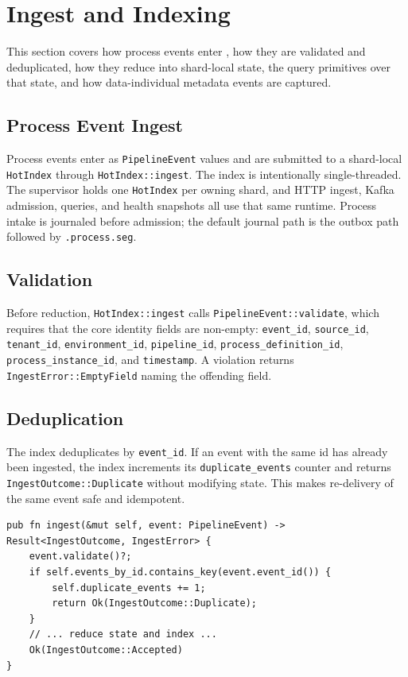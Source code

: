 \section{Ingest and Indexing}
\label{sec:ingest}

This section covers how process events enter \vannak{}, how they are validated
and deduplicated, how they reduce into shard-local state, the query primitives
over that state, and how data-individual metadata events are captured.

\subsection{Process Event Ingest}

Process events enter as \texttt{PipelineEvent} values and are submitted to a
shard-local \texttt{HotIndex} through \texttt{HotIndex::ingest}. The index is
intentionally single-threaded. The supervisor holds one \texttt{HotIndex} per
owning \sitas{} shard, and HTTP ingest, Kafka admission, queries, and health
snapshots all use that same runtime. Process intake is journaled before
admission; the default journal path is the outbox path followed by
\texttt{.process.seg}.

\subsection{Validation}

Before reduction, \texttt{HotIndex::ingest} calls
\texttt{PipelineEvent::validate}, which requires that the core identity fields
are non-empty: \texttt{event\_id}, \texttt{source\_id}, \texttt{tenant\_id},
\texttt{environment\_id}, \texttt{pipeline\_id}, \texttt{process\_definition\_id},
\texttt{process\_instance\_id}, and \texttt{timestamp}. A violation returns
\texttt{IngestError::EmptyField} naming the offending field.

\subsection{Deduplication}

The index deduplicates by \texttt{event\_id}. If an event with the same id has
already been ingested, the index increments its \texttt{duplicate\_events}
counter and returns \texttt{IngestOutcome::Duplicate} without modifying state.
This makes re-delivery of the same event safe and idempotent.

\begin{lstlisting}
pub fn ingest(&mut self, event: PipelineEvent) -> Result<IngestOutcome, IngestError> {
    event.validate()?;
    if self.events_by_id.contains_key(event.event_id()) {
        self.duplicate_events += 1;
        return Ok(IngestOutcome::Duplicate);
    }
    // ... reduce state and index ...
    Ok(IngestOutcome::Accepted)
}
\end{lstlisting}

